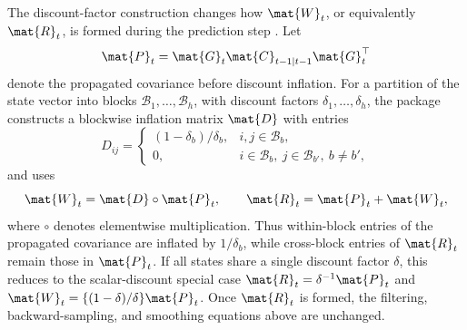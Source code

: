The discount-factor construction changes how $\mat{W}_t$, or equivalently
$\mat{R}_t$, is formed during the prediction step
\citep[Section~6.3]{west1997bayesian}. Let
\[
\mat{P}_t
=
\mat{G}_t\mat{C}_{t-1|t-1}\mat{G}_t^\top
\]
denote the propagated covariance before discount inflation. For a partition of
the state vector into blocks $\mathcal{B}_1,\ldots,\mathcal{B}_h$, with
discount factors $\delta_1,\ldots,\delta_h$, the package constructs a
blockwise inflation matrix $\mat{D}$ with entries
\[
D_{ij}
=
\begin{cases}
(1-\delta_b)/\delta_b, & i,j\in\mathcal{B}_b,\\
0, & i\in\mathcal{B}_b,\ j\in\mathcal{B}_{b'},\ b\neq b',
\end{cases}
\]
and uses
\[
\mat{W}_t=\mat{D}\circ\mat{P}_t,\qquad
\mat{R}_t=\mat{P}_t+\mat{W}_t,
\]
where $\circ$ denotes elementwise multiplication. Thus within-block entries of
the propagated covariance are inflated by $1/\delta_b$, while cross-block
entries of $\mat{R}_t$ remain those in $\mat{P}_t$. If all states share a single
discount factor $\delta$, this reduces to the scalar-discount special case
$\mat{R}_t=\delta^{-1}\mat{P}_t$ and
$\mat{W}_t=\{(1-\delta)/\delta\}\mat{P}_t$. Once $\mat{R}_t$ is formed, the
filtering, backward-sampling, and smoothing equations above are unchanged.

